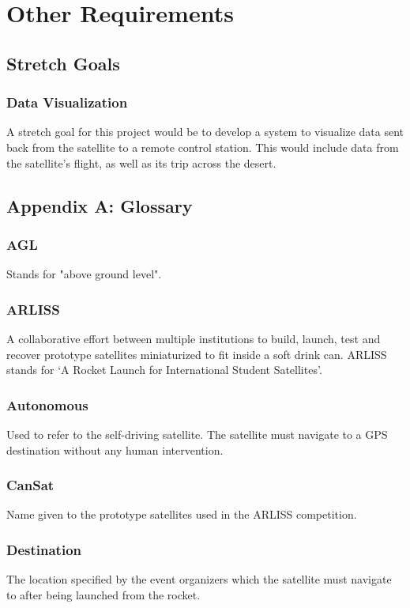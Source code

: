 \documentclass{scrreprt}
\begin{document}
\chapter{Other Requirements}

\section{Stretch Goals}

\subsection{Data Visualization}
A stretch goal for this project would be to develop a system to visualize data sent back from the satellite to a remote control station. This would include data from the satellite's flight, as well as its trip across the desert.

\section{Appendix A: Glossary}

\subsection{AGL}
Stands for "above ground level".

\subsection{ARLISS}
A collaborative effort between multiple institutions to build, launch, test and recover prototype satellites miniaturized to fit inside a soft drink can. ARLISS stands for ‘A Rocket Launch for International Student Satellites’.

\subsection{Autonomous}
Used to refer to the self-driving satellite. The satellite must navigate to a GPS destination without any human intervention.

\subsection{CanSat}
Name given to the prototype satellites used in the ARLISS competition. 

\subsection{Destination}
The location specified by the event organizers which the satellite must navigate to after being launched from the rocket.
\end{document}
